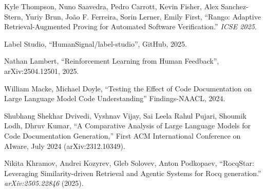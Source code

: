 \documentclass[11pt,a4paper]{article}
\begin{document}
\begin{thebibliography}{9}
    Kyle Thompson, Nuno Saavedra, Pedro Carrott, Kevin Fisher, Alex Sanchez-Stern, Yuriy Brun, João F. Ferreira, Sorin Lerner, Emily First,
    ``Rango: Adaptive Retrieval-Augmented Proving for Automated Software Verification.''
    \emph{ICSE 2025}.

    Label Studio, “HumanSignal/label-studio”, GitHub, 2025.

    Nathan Lambert, ``Reinforcement Learning from Human Feedback'', arXiv:2504.12501, 2025.

    William Macke, Michael Doyle,
    ``Testing the Effect of Code Documentation on Large Language Model Code Understanding'' Findings-NAACL, 2024.

    Shubhang Shekhar Dvivedi, Vyshnav Vijay, Sai Leela Rahul Pujari, Shoumik Lodh, Dhruv Kumar,
    ``A Comparative Analysis of Large Language Models for Code Documentation Generation,''
    First ACM International Conference on AIware, July 2024 (arXiv:2312.10349).

    Nikita Khramov, Andrei Kozyrev, Gleb Solovev, Anton Podkopaev,
    ``RocqStar: Leveraging Similarity-driven Retrieval and Agentic Systems for Rocq generation.''
    \emph{arXiv:2505.22846} (2025).

\end{thebibliography}
\end{document}
